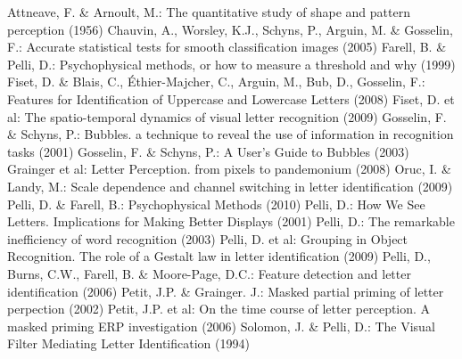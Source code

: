 \documentclass[runningheads,a4paper]{llncs}
\begin{document}
\newpage

\begin{thebibliography}{20}
  	Attneave, F. \& Arnoult, M.: The quantitative study of shape and pattern perception (1956)
  	Chauvin, A., Worsley, K.J., Schyns, P., Arguin, M. \& Gosselin, F.: Accurate statistical tests for smooth classification images (2005)
  		Farell, B. \& Pelli, D.: Psychophysical methods, or how to measure a threshold and why (1999)
  		Fiset, D. \& Blais, C., \'Ethier-Majcher, C., Arguin, M., Bub, D., Gosselin, F.: Features for Identification of Uppercase and Lowercase Letters (2008)
  		Fiset, D. et al: The spatio-temporal dynamics of visual letter recognition (2009)
  			Gosselin, F. \& Schyns, P.: Bubbles. a technique to reveal the use of information in recognition tasks (2001)
  		Gosselin, F. \& Schyns, P.: A User's Guide to Bubbles (2003)
  		Grainger et al: Letter Perception. from pixels to pandemonium (2008)
  		Oruc, I. \& Landy, M.: Scale dependence and channel switching in letter identification (2009)
  		Pelli, D. \& Farell, B.: Psychophysical Methods (2010)
  			Pelli, D.: How We See Letters. Implications for Making Better Displays (2001)
  		Pelli, D.: The remarkable inefficiency of word recognition (2003)
  		Pelli, D. et al: Grouping in Object Recognition. The role of a Gestalt law in letter identification (2009)
  		Pelli, D., Burns, C.W., Farell, B. \& Moore-Page, D.C.: Feature detection and letter identification (2006)
  	Petit, J.P. \& Grainger. J.: Masked partial priming of letter perpection (2002)
  		Petit, J.P. et al: On the time course of letter perception. A masked priming ERP investigation (2006)
  	Solomon, J. \& Pelli, D.: The Visual Filter Mediating Letter Identification (1994)


\end{thebibliography}
\end{document}
